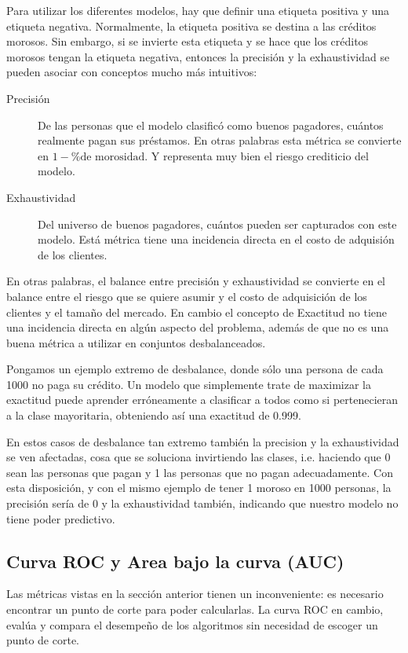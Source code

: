 Para utilizar los diferentes modelos, hay que definir una etiqueta positiva y una etiqueta negativa. Normalmente, la etiqueta positiva se destina a las créditos morosos. Sin embargo, si se invierte esta etiqueta y se hace que los créditos morosos tengan la etiqueta negativa, entonces la precisión y la exhaustividad se pueden asociar con conceptos mucho más intuitivos:

\begin{description}
	\item [Precisión] De las personas que el modelo clasificó como buenos pagadores, cuántos realmente pagan sus préstamos. En otras palabras esta métrica se convierte en $1 - \text{\% de morosidad}$. Y representa muy bien el riesgo crediticio del modelo.
	\item [Exhaustividad] Del universo de buenos pagadores, cuántos pueden ser capturados con este modelo. Está métrica tiene una incidencia directa en el costo de adquisión de los clientes.
\end{description}

En otras palabras, el balance entre precisión y exhaustividad se convierte en el balance entre el riesgo que se quiere asumir y el costo de adquisición de los clientes y el tamaño del mercado. En cambio el concepto de Exactitud no tiene una incidencia directa en algún aspecto del problema, además de que no es una buena métrica a utilizar en conjuntos desbalanceados.

Pongamos un ejemplo extremo de desbalance, donde sólo una persona de cada 1000 no paga su crédito. Un modelo que simplemente trate de maximizar la exactitud puede aprender erróneamente a clasificar a todos como si pertenecieran a la clase mayoritaria, obteniendo así una exactitud de 0.999.

En estos casos de desbalance tan extremo también la precision y la exhaustividad se ven afectadas, cosa que se soluciona invirtiendo las clases, i.e. haciendo que 0 sean las personas que pagan y 1 las personas que no pagan adecuadamente. Con esta disposición, y con el mismo ejemplo de tener 1 moroso en 1000 personas, la precisión sería de 0 y la exhaustividad también, indicando que nuestro modelo no tiene poder predictivo.

\subsection{Curva ROC y Area bajo la curva (AUC)}

Las métricas vistas en la sección anterior tienen un inconveniente: es necesario encontrar un punto de corte para poder calcularlas. La curva ROC en cambio, evalúa y compara el desempeño de los algoritmos sin necesidad de escoger un punto de corte.

